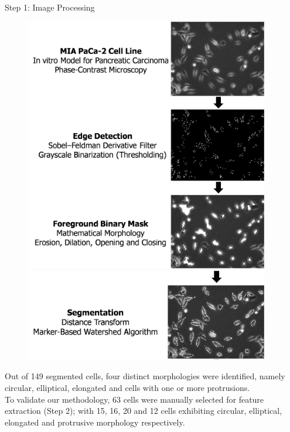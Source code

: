 \documentclass[final,hyperref={pdfpagelabels=false}]{beamer}
\begin{document}
\begin{frame}[t]
\begin{columns}[t]
\begin{column}{.32\textwidth}
\begin{block}{Step 1: Image Processing}
\begin{figure}
\includegraphics[width=0.70\linewidth]{ImgProcess1Sml.png}\\
\includegraphics[width=0.70\linewidth]{ImgProcess2Sml_Cropped.png}
\end{figure}

\vspace{0.1em}
Out of 149 segmented cells, four distinct morphologies were identified, namely circular, elliptical, elongated and cells with one or more protrusions.\\
\vspace{0.5em}
To validate our methodology, 63 cells were manually selected for feature extraction (Step 2); with 15, 16, 20 and 12 cells exhibiting circular, elliptical, elongated and protrusive morphology respectively.

\end{block}

\end{column}

\begin{column}{.01\textwidth}\end{column} 


\end{columns}
\end{frame}
\end{document}
